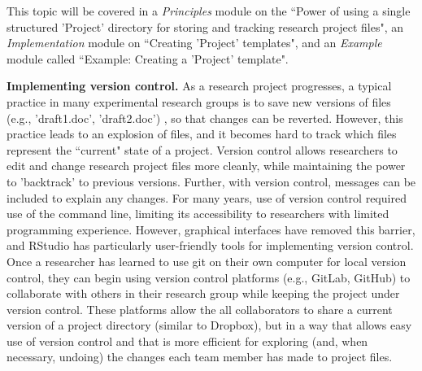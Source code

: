\documentclass[pdftex,english,11pt,parskip=half]{scrartcl}
\begin{document}
This topic will be
covered in a \textit{Principles} module on the ``Power of using a single
structured 'Project' directory for storing and tracking research project files",
an \textit{Implementation} module on ``Creating 'Project' templates", and an
\textit{Example} module called ``Example: Creating a 'Project' template".

\textbf{Implementing version control.} As a research project progresses, a typical practice in many experimental research groups is to save new versions of files (e.g., 'draft1.doc', 'draft2.doc') \cite{bryan2018excuse}, so that changes can be reverted. However, this practice leads to an explosion of files, and it becomes hard to track which files represent the ``current" state of a project. Version control allows researchers to edit and change research project files more cleanly, while maintaining the power to 'backtrack' to previous versions. Further, with version control, messages can be included to explain any changes. For many years, use of version control required use of the command line,
limiting its accessibility to researchers with limited programming experience.
However, graphical interfaces have removed this barrier, and RStudio has 
particularly user-friendly tools for implementing version control. Once a researcher has learned to use git on their own computer for local version control, they can begin using version control 
platforms (e.g., GitLab, GitHub) to collaborate with others in their research
group while keeping the project under version control. These platforms allow
the all collaborators to share a current version of a project directory 
(similar to Dropbox), but in a way that allows easy use of version control 
and that is more efficient for exploring (and, when necessary, undoing) the changes 
each team member has made to project files. 
\end{document}
